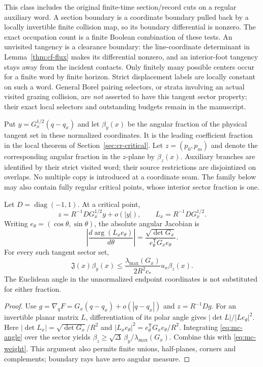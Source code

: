 This class includes the original finite-time section/record cuts on a
regular auxiliary word. A section boundary is a coordinate boundary
pulled back by a locally invertible finite collision map, so its
boundary differential is nonzero. The exact occupation count is a
finite Boolean combination of these tests. An unvisited tangency is
a clearance boundary: the line-coordinate determinant in
Lemma~\ref{thm:cf-flux} makes its differential nonzero, and
an interior-foot tangency stays away from the incident contacts.
Only finitely many possible centers occur for a finite word by finite
horizon. Strict displacement labels are locally constant on such a
word. General Borel pairing selectors, or strata involving an actual
visited grazing collision, are \emph{not} asserted to have this tangent
sector property; their exact local selectors and outstanding budgets
remain in the manuscript.

Put $y=G_x^{1/2}(q-q_x)$ and let $\beta_y(x)$ be the angular fraction
of the physical tangent set in these normalized coordinates. It is
the leading coefficient fraction in the local theorem of
Section~\ref{sec:cr-critical}. Let $z=(p_0,p_m)$ and denote the
corresponding angular fraction in the $z$-plane by $\beta_z(x)$.
Auxiliary branches are identified by their strict visited word; their
source restrictions are disjointized on overlaps. No multiple copy is
introduced at a coordinate seam. The family below may also contain
fully regular critical points, whose interior sector fraction is one.

\begin{lemma}
\label{lem:mc-angle}
Let $D=\operatorname{diag}(-1,1)$. At a critical point,
\begin{equation}\label{eq:mc-linear}
 z=R^{-1}D G_x^{1/2}y+o(|y|),\qquad L_x=R^{-1}D G_x^{1/2}.
\end{equation}
Writing $e_\theta=(\cos\theta,\sin\theta)$, the absolute angular
Jacobian is
\begin{equation}\label{eq:mc-angle}
 \left|\frac{d\arg(L_xe_\theta)}{d\theta}\right|
       =\frac{\sqrt{\det G_x}}{e_\theta^{\mathsf T}G_xe_\theta}.
\end{equation}
For every such tangent sector set,
\begin{equation}\label{eq:mc-sector-comparison}
 \mathfrak J(x)\beta_y(x)
       \le\frac{\lambda_{\max}(G_x)}{2R^2c_*}
                                     u_x\beta_z(x).
\end{equation}
The Euclidean angle in the unnormalized endpoint coordinates is not
substituted for either fraction.
\end{lemma}
\begin{proof}
Use $g=\nabla_qF=G_x(q-q_x)+o(|q-q_x|)$ and $z=R^{-1}Dg$.
For an invertible planar matrix $L$, differentiation of its polar angle
gives $|\det L|/|Le_\theta|^2$. Here
$|\det L_x|=\sqrt{\det G_x}/R^2$ and
$|L_xe_\theta|^2=e_\theta^{\mathsf T}G_xe_\theta/R^2$.
Integrating \eqref{eq:mc-angle} over the sector yields
$\beta_z\ge\sqrt\Delta\,\beta_y/\lambda_{\max}(G_x)$.
Combine this with \eqref{eq:mc-weight}. This argument also permits
finite unions, half-planes, corners and complements; boundary rays
have zero angular measure.
\end{proof}

